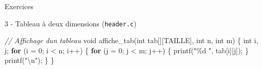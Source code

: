 \documentclass[
  10pt,
  french,
  ignorenonframetext,
  aspectratio=169,
]{beamer}
\newenvironment{Shaded}{}{}
\newcommand{\CommentTok}[1]{\textcolor[rgb]{0.38,0.63,0.69}{\textit{#1}}}
\newcommand{\ControlFlowTok}[1]{\textcolor[rgb]{0.00,0.44,0.13}{\textbf{#1}}}
\newcommand{\DataTypeTok}[1]{\textcolor[rgb]{0.56,0.13,0.00}{#1}}
\newcommand{\DecValTok}[1]{\textcolor[rgb]{0.25,0.63,0.44}{#1}}
\newcommand{\NormalTok}[1]{#1}
\newcommand{\OperatorTok}[1]{\textcolor[rgb]{0.40,0.40,0.40}{#1}}
\newcommand{\SpecialCharTok}[1]{\textcolor[rgb]{0.25,0.44,0.63}{#1}}
\newcommand{\StringTok}[1]{\textcolor[rgb]{0.25,0.44,0.63}{#1}}
\begin{document}
\begin{frame}[fragile]{Exercices}
\protect\hypertarget{exercices-8}{}
\begin{block}{3 - Tableau à deux dimensions (\texttt{header.c})}
\protect\hypertarget{tableau-uxe0-deux-dimensions-header.c-1}{}
\begin{Shaded}
\begin{Highlighting}[]
\CommentTok{// Affichage d\textquotesingle{}un tableau}
\DataTypeTok{void}\NormalTok{ affiche\_tab}\OperatorTok{(}\DataTypeTok{int}\NormalTok{ tab}\OperatorTok{[][}\NormalTok{TAILLE}\OperatorTok{],} \DataTypeTok{int}\NormalTok{ n}\OperatorTok{,} \DataTypeTok{int}\NormalTok{ m}\OperatorTok{)} \OperatorTok{\{}
    \DataTypeTok{int}\NormalTok{ i}\OperatorTok{,}\NormalTok{ j}\OperatorTok{;}
    \ControlFlowTok{for} \OperatorTok{(}\NormalTok{i }\OperatorTok{=} \DecValTok{0}\OperatorTok{;}\NormalTok{ i }\OperatorTok{\textless{}}\NormalTok{ n}\OperatorTok{;}\NormalTok{ i}\OperatorTok{++)}
    \OperatorTok{\{}
        \ControlFlowTok{for} \OperatorTok{(}\NormalTok{j }\OperatorTok{=} \DecValTok{0}\OperatorTok{;}\NormalTok{ j }\OperatorTok{\textless{}}\NormalTok{ m}\OperatorTok{;}\NormalTok{ j}\OperatorTok{++)}
        \OperatorTok{\{}
\NormalTok{            printf}\OperatorTok{(}\StringTok{"\%d "}\OperatorTok{,}\NormalTok{ tab}\OperatorTok{[}\NormalTok{i}\OperatorTok{][}\NormalTok{j}\OperatorTok{]);}
        \OperatorTok{\}}
\NormalTok{        printf}\OperatorTok{(}\StringTok{"}\SpecialCharTok{\textbackslash{}n}\StringTok{"}\OperatorTok{);}
    \OperatorTok{\}}
\OperatorTok{\}}
\end{Highlighting}
\end{Shaded}
\end{block}
\end{frame}
\end{document}
